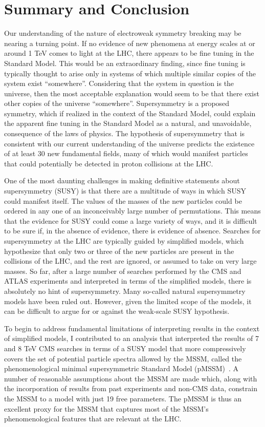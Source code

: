 \FloatBarrier
\chapter{Summary and Conclusion}
Our understanding of the nature of electroweak symmetry breaking may be nearing a turning point. If no evidence of new phenomena at energy scales at or around 1 TeV comes to light at the LHC, there appears to be fine tuning in the Standard Model. This would be an extraordinary finding, since fine tuning is typically thought to arise only in systems of which multiple similar copies of the system exist ``somewhere''. Considering that the system in question is the universe, then the most acceptable explanation would seem to be that there exist other copies of the universe ``somewhere''. Supersymmetry is a proposed symmetry, which if realized in the context of the Standard Model, could explain the apparent fine tuning in the Standard Model as a natural, and unavoidable, consequence of the laws of physics. The hypothesis of supersymmetry that is consistent with our current understanding of the universe predicts the existence of at least 30 new fundamental fields, many of which would manifest particles that could potentially be detected in proton collisions at the LHC. 

One of the most daunting challenges in making definitive statements about supersymmetry (SUSY) is that there are a multitude of ways in which SUSY could manifest itself. The values of the masses of the new particles could be ordered in any one of an inconceivably large number of permutations. This means that the evidence for SUSY could come a large variety of ways, and it is difficult to be sure if, in the absence of evidence, there is evidence of absence. Searches for supersymmetry at the LHC are typically guided by simplified models, which hypothesize that only two or three of the new particles are present in the collisions of the LHC, and the rest are ignored, or assumed to take on very large masses. So far, after a large number of searches performed by the CMS and ATLAS experiments and interpreted in terms of the simplified models, there is absolutely no hint of supersymmetry. Many so-called natural supersymmetry models have been ruled out. However, given the limited scope of the models, it can be difficult to argue for or against the weak-scale SUSY hypothesis.

To begin to address fundamental limitations of interpreting results in the context of simplified models, I contributed to an analysis that interpreted the results of 7 and 8 TeV CMS searches in terms of a SUSY model that more compressively covers the set of potential particle spectra allowed by the MSSM, called the phenomenological minimal supersymmetric Standard Model (pMSSM)~\cite{Khachatryan:2016nvf}. A number of reasonable assumptions about the MSSM are made which, along with the incorporation of results from past experiments and non-CMS data, constrain the MSSM to a model with just 19 free parameters. The pMSSM is thus an excellent proxy for the MSSM that captures most of the MSSM's phenomenological features that are relevant at the LHC. 

